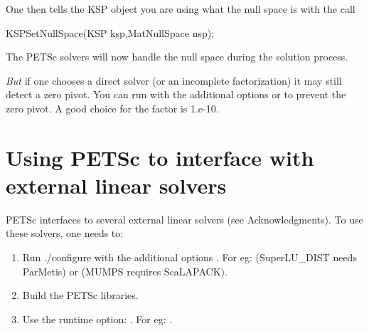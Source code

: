 One then tells the KSP object you are using what the null space is with the call
\begin{tabbing}
KSPSetNullSpace(KSP ksp,MatNullSpace nsp);
\end{tabbing}
The PETSc solvers will now handle the null space during the solution process.

\emph{But} if one chooses a direct solver (or an incomplete factorization)
it may still detect a zero pivot. 
You can run with the additional options 
 or   to
prevent the zero pivot. A good choice for the  factor is 1.e-10.

\section{Using PETSc to interface with external linear solvers}
\label{sec_externalsol}

PETSc interfaces to several external linear solvers (see Acknowledgments).
To use these solvers, one needs to:

\begin{enumerate}
\item Run ./configure with the additional options .
For eg:   (SuperLU\_DIST needs ParMetis) or
  (MUMPS requires ScaLAPACK).
\item Build the PETSc libraries.
\item Use the runtime option:  
.
For eg:   .
\end{enumerate}

